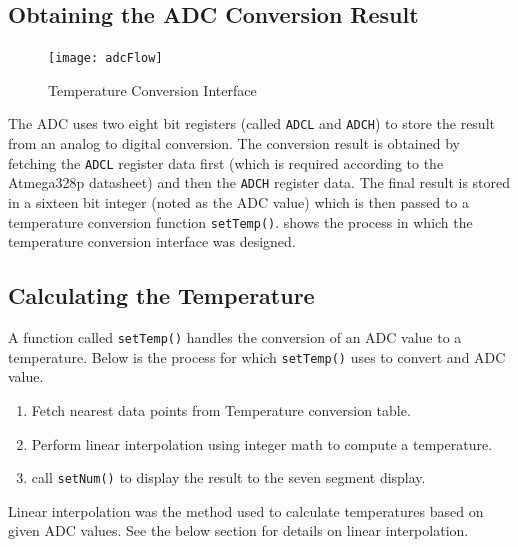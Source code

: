 \documentclass[main.tex]{subfiles}
\begin{document}
		\subsection{Obtaining the ADC Conversion Result}
		\begin{figure}[H]
			\begin{center}
				\texttt{[image: adcFlow]}
			\end{center}
			\caption{Temperature Conversion Interface}
			\label{fig:tempConvIfc}
		\end{figure}

		The ADC uses two eight bit registers (called \lstinline{ADCL} and
		\lstinline{ADCH}) to store the result from an analog to digital conversion.
		The conversion result is obtained by fetching the \lstinline{ADCL} register
		data first (which is required according to the Atmega328p datasheet) and
		then the \lstinline{ADCH} register data. The final result is stored in a
		sixteen bit integer (noted as the ADC value) which is then passed to a
		temperature conversion function \lstinline{setTemp()}. 
		shows the process in which the temperature conversion interface was
		designed.

		\subsection{Calculating the Temperature}
		A function called \lstinline{setTemp()} handles the conversion of an ADC
		value to a temperature. Below is the process for which
		\lstinline{setTemp()} uses to convert and ADC value. 
	
		\begin{enumerate}
			\item Fetch nearest data points from Temperature conversion table.
			\item Perform linear interpolation using integer math to compute a
				temperature.
			\item call \lstinline{setNum()} to display the result to the seven segment
				display.
		\end{enumerate}	

		Linear interpolation was the method used to calculate temperatures based on
		given ADC values. See the below section for details on linear interpolation.
\end{document}
